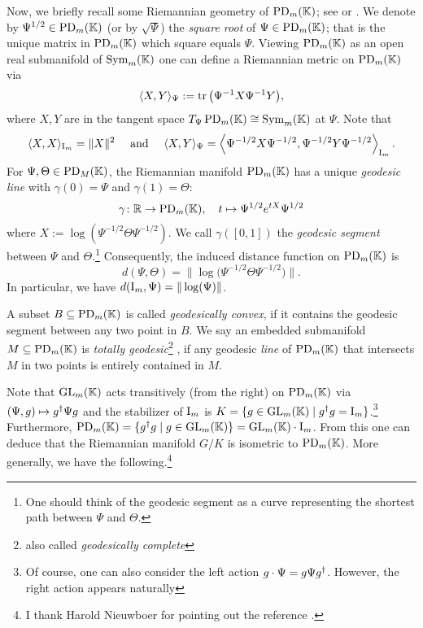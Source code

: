 Now, we briefly recall some Riemannian geometry of $\operatorname{PD}_m(\mathbb K)$; see \cite{bhatia2007positive} or \cite[Chapter~II.10]{BridsonHaefligerBook}. We denote by $\Psi^{1/2} \in \operatorname{PD}_m(\mathbb K)$ (or by $\sqrt{\Psi}$) the \emph{square root} of $\Psi \in \operatorname{PD}_m(\mathbb K)$; that is the unique matrix in $\operatorname{PD}_m(\mathbb K)$ which square equals $\Psi$. Viewing $\operatorname{PD}_m(\mathbb K)$ as an open real submanifold of $\operatorname{Sym}_m(\mathbb K)$ one can define a Riemannian metric on $\operatorname{PD}_m(\mathbb K)$ via 
	\[ \langle X, Y \rangle_{\Psi} := \operatorname{tr} \big( \Psi^{-1}X\Psi^{-1}Y \big) , \]
where $X,Y$ are in the tangent space $T_{\Psi} \operatorname{PD}_m(\mathbb K) \cong \operatorname{Sym}_m(\mathbb K)$ at $\Psi$. Note that
	\[ \langle X, X \rangle_{\operatorname{I}_m} = \|X\|^2 \quad \text{ and } \quad 
	\langle X, Y \rangle_{\Psi} = \left\langle \Psi^{-1/2} X \Psi^{-1/2},  \Psi^{-1/2} Y \Psi^{-1/2} \right\rangle_{\operatorname{I}_m}. \]
For $\Psi, \Theta \in \operatorname{PD}_M(\mathbb K)$, the Riemannian manifold $\operatorname{PD}_m(\mathbb K)$ has a unique \emph{geodesic line}
 with $\gamma(0) = \Psi$ and $\gamma(1) = \Theta$:
	\begin{equation}\label{eq:GeodesicPDm}
		\gamma \colon \mathbb R \to \operatorname{PD}_m(\mathbb K), \quad t \mapsto \Psi^{1/2} e^{tX} \Psi^{1/2}
	\end{equation}
where $X := \log(\Psi^{-1/2} \Theta \Psi^{-1/2})$. We call $\gamma([0,1])$ the \emph{geodesic segment} between $\Psi$ and $\Theta$.\footnote{One should think of the geodesic segment as a curve representing the shortest path between $\Psi$ and $\Theta$.}
Consequently, the induced distance function on $\operatorname{PD}_m(\mathbb K)$ is 
	\[ d(\Psi, \Theta) = \big\| \log \big( \Psi^{-1/2} \Theta \Psi^{-1/2} \big) \big\|. \]
In particular, we have $d(\operatorname{I}_m, \Psi) = \|\log(\Psi)\|$.

A subset $B \subseteq \operatorname{PD}_m(\mathbb K)$ is called \emph{geodesically convex}, if it contains the geodesic segment between any two point in $B$.
We say an embedded submanifold $M \subseteq \operatorname{PD}_m(\mathbb K)$ is \emph{totally geodesic}\footnote{also called \emph{geodesically complete}}
, if any geodesic \emph{line} of $\operatorname{PD}_m(\mathbb K)$ that intersects $M$ in two points is entirely contained in $M$.

Note that $\operatorname{GL}_m(\mathbb K)$ acts transitively (from the right) on $\operatorname{PD}_m(\mathbb K)$ via $(\Psi, g) \mapsto g^{\dagger} \Psi g$ and the stabilizer of $\operatorname{I}_m$ is $K = \{ g \in \operatorname{GL}_m(\mathbb K) \mid g^{\dagger} g = \operatorname{I}_m \}$.\footnote{Of course, one can also consider the left action $g \cdot \Psi  =  g \Psi g^{\dagger}$. However, the right action appears naturally}
Furthermore, $\operatorname{PD}_m(\mathbb K) = \{ g^{\dagger} g \mid g \in \operatorname{GL}_m(\mathbb K) \} = \operatorname{GL}_m(\mathbb K) \cdot \operatorname{I}_m$.
From this one can deduce that the Riemannian manifold $G/K$ is isometric to $\operatorname{PD}_m(\mathbb K)$.
More generally, we have the following.\footnote{I thank Harold Nieuwboer for pointing out the reference \cite[Theorem~II.10.58]{BridsonHaefligerBook}.}

